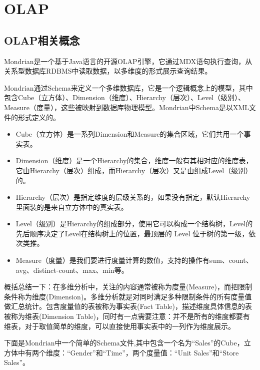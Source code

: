 
\section{OLAP}
\subsection{OLAP相关概念}
Mondrian是一个基于Java语言的开源OLAP引擎，它通过MDX语句执行查询，从关系型数据库RDBMS中读取数据，以多维度的形式展示查询结果。
\par Mondrian通过Schema来定义一个多维数据库，它是一个逻辑概念上的模型，其中包含Cube（立方体）、Dimension（维度）、Hierarchy（层次）、Level（级别）、Measure（度量），这些被映射到数据库物理模型。Mondrian中Schema是以XML文件的形式定义的。
\begin{itemize}
\item Cube（立方体）是一系列Dimension和Measure的集合区域，它们共用一个事实表。
\item Dimension（维度）是一个Hierarchy的集合，维度一般有其相对应的维度表，它由Hierarchy（层次）组成，而Hierarchy（层次）又是由组成Level（级别）的。
\item Hierarchy（层次）是指定维度的层级关系的，如果没有指定，默认Hierarchy里面装的是来自立方体中的真实表。
\item Level（级别）是Hierarchy的组成部分，使用它可以构成一个结构树，Level的先后顺序决定了Level在结构树上的位置，最顶层的 Level 位于树的第一级，依次类推。
\item Measure（度量）是我们要进行度量计算的数值，支持的操作有sum、count、avg、distinct-count、max、min等。
\end{itemize}
\par 概括总结一下：在多维分析中，关注的内容通常被称为度量(Measure)，而把限制条件称为维度(Dimension)。多维分析就是对同时满足多种限制条件的所有度量值做汇总统计。包含度量值的表被称为事实表(Fact Table)，描述维度具体信息的表被称为维表(Dimension Table)，同时有一点需要注意：并不是所有的维度都要有维表，对于取值简单的维度，可以直接使用事实表中的一列作为维度展示。
\par 下面是Mondrian中一个简单的Schema文件,其中包含一个名为“Sales”的Cube，立方体中有两个维度：“Gender”和“Time”，两个度量值：“Unit Sales”和“Store Sales”。

